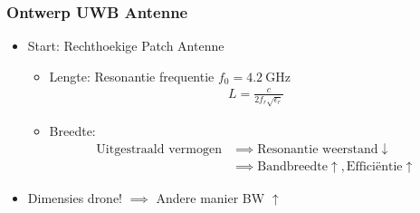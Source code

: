 \documentclass{beamer}
\begin{document}
  \begin{frame}
  \frametitle{Ontwerp UWB Antenne}
  \begin{itemize}
    \item Start: Rechthoekige Patch Antenne
      \begin{itemize}
        \item Lengte: Resonantie frequentie $f_0 = \SI{4.2}{\giga\hertz}$
              \begin{align}  L = \frac{c}{2 f_r \sqrt{\epsilon_r}}  \nonumber \end{align}
        \item Breedte: \begin{align} \text{Uitgestraald vermogen} \nonumber & \implies \text{Resonantie weerstand} \downarrow \\ & \implies \text{Bandbreedte} \uparrow, \text{Effici\"entie} \uparrow \nonumber \end{align}

      \end{itemize}
    \item Dimensies drone! $\implies$ Andere manier BW $\uparrow$ 
    \end{itemize}
  \end{frame}
\end{document}
